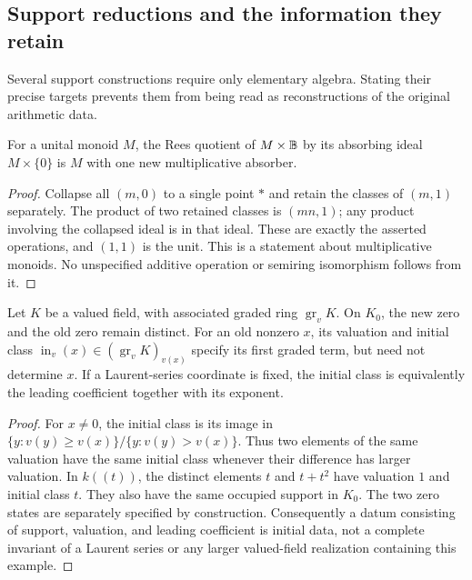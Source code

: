 \subsection{Support reductions and the information they retain}

Several support constructions require only elementary algebra. Stating
their precise targets prevents them from being read as reconstructions
of the original arithmetic data.

\begin{proposition}
\label{prop:rees-support-quotient}
For a unital monoid $M$, the Rees quotient of $M\times\mathbb B$ by its absorbing
ideal $M\times\{0\}$ is $M$ with one new multiplicative absorber.
\end{proposition}
\begin{proof}
Collapse all $(m,0)$ to a single point $*$ and retain the classes of
$(m,1)$ separately. The product of two retained classes is $(mn,1)$;
any product involving the collapsed ideal is in that ideal. These are
exactly the asserted operations, and $(1,1)$ is the unit. This is a
statement about multiplicative monoids. No unspecified additive
operation or semiring isomorphism follows from it.
\end{proof}

\begin{proposition}
\label{prop:initial-data}
Let $K$ be a valued field, with associated graded ring
$\operatorname{gr}_vK$. On $K_0$, the new zero and the old zero remain
distinct. For an old nonzero $x$, its valuation and initial class
$\operatorname{in}_v(x)\in(\operatorname{gr}_vK)_{v(x)}$ specify its first
graded term, but need not determine $x$. If a Laurent-series coordinate
is fixed, the initial class is equivalently the leading coefficient
together with its exponent.
\end{proposition}
\begin{proof}
For $x\ne0$, the initial class is its image in
$\{y:v(y)\ge v(x)\}/\{y:v(y)>v(x)\}$. Thus two elements of the same
valuation have the same initial class whenever their difference has
larger valuation. In $k((t))$, the distinct elements $t$ and $t+t^2$
have valuation $1$ and initial class $t$. They also have the same
occupied support in $K_0$. The two zero states are separately specified
by construction. Consequently a datum consisting of support, valuation,
and leading coefficient is initial data, not a complete invariant of
a Laurent series or any larger valued-field realization containing
this example.
\end{proof}

